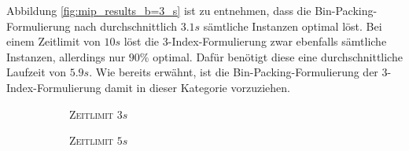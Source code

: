 Abbildung \ref{fig:mip_results_b=3_s} ist zu entnehmen, dass die Bin-Packing-Formulierung nach durchschnittlich
$3.1s$ sämtliche Instanzen optimal löst. Bei einem Zeitlimit von $10s$ löst die 3-Index-Formulierung zwar ebenfalls
sämtliche Instanzen, allerdings nur $90 \%$ optimal. Dafür benötigt diese eine durchschnittliche Laufzeit von
$5.9s$. Wie bereits erwähnt, ist die Bin-Packing-Formulierung der 3-Index-Formulierung damit in dieser Kategorie vorzuziehen.

\begin{figure}[H]
\centering
\begin{subfigure}[b]{0.3\textwidth}
\centering
{}
\caption{\textsc{Zeitlimit} $3s$}
\label{}
\end{subfigure}
\begin{subfigure}[b]{0.3\textwidth}
\centering
{}
\caption{\textsc{Zeitlimit} $5s$}
\label{}
\end{subfigure}
\begin{subfigure}[b]{0.3\textwidth}
\centering
{}
\end{subfigure}
\end{figure}
